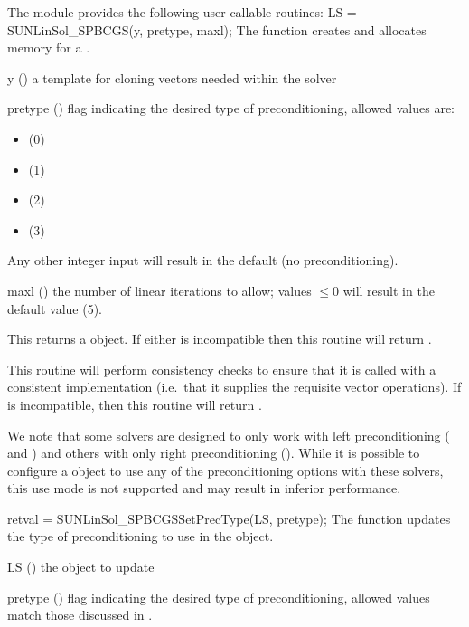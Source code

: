 The module {\sunlinsolspbcgs} provides the following user-callable routines:
{
  LS = SUNLinSol\_SPBCGS(y, pretype, maxl);
}
{
  The function  creates and allocates memory for
  a {\spbcg} .
}
{
  \begin{args}[pretype]
  \item[y] ()
    a template for cloning vectors needed within the solver
  \item[pretype] ()
    flag indicating the desired type of preconditioning, allowed
    values are:
    \begin{itemize}
    \item {} (0)
    \item {} (1)
    \item {} (2)
    \item {} (3)
    \end{itemize}
    Any other integer input will result in the default (no
    preconditioning).
  \item[maxl] ()
    the number of linear iterations to allow; values $\le0$ will
    result in the default value (5).
  \end{args}
}
{
  This returns a  object.  If either  is
  incompatible then this routine will return .
}
{
  This routine will perform consistency checks to ensure that it is
  called with a consistent {\nvector} implementation (i.e.~that it
  supplies the requisite vector operations).  If  is
  incompatible, then this routine will return .

  We note that some {\sundials} solvers are designed to only work
  with left preconditioning ({\ida} and {\idas}) and others with only
  right preconditioning ({\kinsol}). While it is possible to configure
  a {\sunlinsolspbcgs} object to use any of the preconditioning options
  with these solvers, this use mode is not supported and may result in
  inferior performance.
}
{
  retval = SUNLinSol\_SPBCGSSetPrecType(LS, pretype);
}
{
  The function  updates the type of
  preconditioning to use in the {\sunlinsolspbcgs} object.
}
{
  \begin{args}[pretype]
  \item[LS] ()
    the {\sunlinsolspbcgs} object to update
  \item[pretype] ()
    flag indicating the desired type of preconditioning, allowed
    values match those discussed in .
  \end{args}
}
